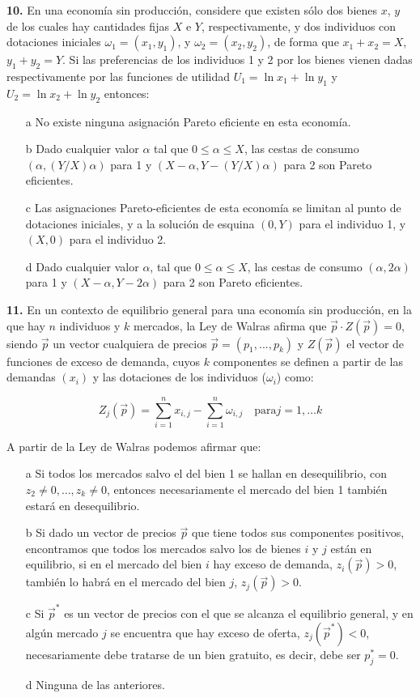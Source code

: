 \documentclass{nuevotema}
\begin{document}
\textbf{10.} En una economía sin producción, considere que existen sólo dos bienes $x$, $y$ de los cuales hay cantidades fijas $X$ e $Y$, respectivamente, y dos individuos con dotaciones iniciales $\omega_1 = (x_1, y_1)$, y $\omega_2 = (x_2, y_2)$, de forma que $x_1 + x_2 = X$, $y_1 + y_2=Y$. Si las preferencias de los individuos 1 y 2 por los bienes vienen dadas respectivamente por las funciones de utilidad $U_1 = \ln x_1 + \ln y_1$ y $U_2 = \ln x_2 + \ln y_2$ entonces:
\begin{itemize}
	\item[a] No existe ninguna asignación Pareto eficiente en esta economía.
	\item[b] Dado cualquier valor $\alpha$ tal que $0 \leq \alpha \leq X$, las cestas de consumo $(\alpha, (Y/X)\alpha)$ para 1 y $(X-\alpha, Y-(Y/X)\alpha)$ para 2 son Pareto eficientes.
	\item[c] Las asignaciones Pareto-eficientes de esta economía se limitan al punto de dotaciones iniciales, y a la solución de esquina $(0, Y)$ para el individuo 1, y $(X,0)$ para el individuo 2.
	\item[d] Dado cualquier valor $\alpha$, tal que $0 \leq \alpha \leq X$, las cestas de consumo $( \alpha, 2 \alpha )$ para 1 y $(X - \alpha, Y - 2 \alpha)$ para 2 son Pareto eficientes.
\end{itemize}

\textbf{11.} En un contexto de equilibrio general para una economía sin producción, en la que hay $n$ individuos y $k$ mercados, la Ley de Walras afirma que $\vec{p} \cdot Z(\vec{p}) = 0$, siendo $\vec{p}$ un vector cualquiera de precios $\vec{p}=(p_1,...,p_k)$ y $Z(\vec{p})$ el vector de funciones de exceso de demanda, cuyos $k$ componentes se definen a partir de las demandas $(x_i)$ y las dotaciones de los individuos ($\omega_i$) como:

\begin{equation*}
Z_j (\vec{p}) = \sum_{i=1}^n x_{i,j} - \sum_{i=1}^n \omega_{i,j} \quad \text{para} j=1,\ldots k
\end{equation*}

A partir de la Ley de Walras podemos afirmar que:

\begin{itemize}
	\item[a] Si todos los mercados salvo el del bien 1 se hallan en desequilibrio, con $z_2 \neq 0, \ldots, z_k \neq 0$, entonces necesariamente el mercado del bien 1 también estará en desequilibrio.
	\item[b] Si dado un vector de precios $\vec{p}$ que tiene todos sus componentes positivos, encontramos que todos los mercados salvo los de bienes $i$ y $j$ están en equilibrio, si en el mercado del bien $i$ hay exceso de demanda, $z_i(\vec{p}) >0$, también lo habrá en el mercado del bien $j$, $z_j(\vec{p}) > 0$.
	\item[c] Si $\vec{p}^*$ es un vector de precios con el que se alcanza el equilibrio general, y en algún mercado $j$ se encuentra que hay exceso de oferta, $z_j (\vec{p}^*) < 0$, necesariamente debe tratarse de un bien gratuito, es decir, debe ser $p_j^*= 0$.
	\item[d] Ninguna de las anteriores.
\end{itemize}
\end{document}
